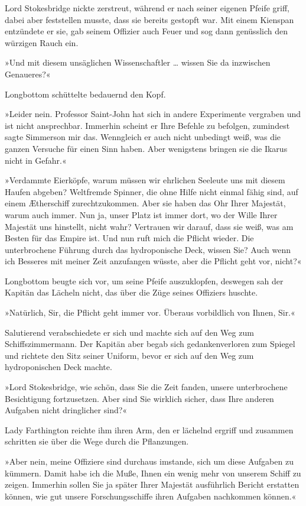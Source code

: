 Lord Stokesbridge nickte zerstreut, während er nach seiner eigenen
Pfeife griff, dabei aber feststellen musste, dass sie bereits
gestopft war. Mit einem Kienspan entzündete er sie, gab seinem
Offizier auch Feuer und sog dann genüsslich den würzigen Rauch
ein.

»Und mit diesem unsäglichen Wissenschaftler \ldots{} wissen Sie da
inzwischen Genaueres?«

Longbottom schüttelte bedauernd den Kopf.

»Leider nein. Professor Saint-John hat sich in andere Experimente
vergraben und ist nicht ansprechbar. Immerhin scheint er Ihre
Befehle zu befolgen, zumindest sagte Simmerson mir das. Wenngleich
er auch nicht unbedingt weiß, was die ganzen Versuche für einen
Sinn haben. Aber wenigstens bringen sie die Ikarus nicht in
Gefahr.«

»Verdammte Eierköpfe, warum müssen wir ehrlichen Seeleute uns mit
diesem Haufen abgeben? Weltfremde Spinner, die ohne Hilfe nicht
einmal fähig sind, auf einem Ætherschiff zurechtzukommen. Aber sie
haben das Ohr Ihrer Majestät, warum auch immer. Nun ja, unser Platz
ist immer dort, wo der Wille Ihrer Majestät uns hinstellt, nicht
wahr? Vertrauen wir darauf, dass sie weiß, was am Besten für das
Empire ist. Und nun ruft mich die Pflicht wieder. Die unterbrochene
Führung durch das hydroponische Deck, wissen Sie? Auch wenn ich
Besseres mit meiner Zeit anzufangen wüsste, aber die Pflicht geht
vor, nicht?«

Longbottom beugte sich vor, um seine Pfeife auszuklopfen, deswegen
sah der Kapitän das Lächeln nicht, das über die Züge seines
Offiziers huschte.

»Natürlich, Sir, die Pflicht geht immer vor. Überaus vorbildlich
von Ihnen, Sir.«

Salutierend verabschiedete er sich und machte sich auf den Weg zum
Schiffszimmermann. Der Kapitän aber begab sich gedankenverloren zum
Spiegel und richtete den Sitz seiner Uniform, bevor er sich auf den
Weg zum hydroponischen Deck machte.

\bigpar

»Lord Stokesbridge, wie schön, dass Sie die Zeit fanden, unsere
unterbrochene Besichtigung fortzusetzen. Aber sind Sie wirklich
sicher, dass Ihre anderen Aufgaben nicht dringlicher sind?«

Lady Farthington reichte ihm ihren Arm, den er lächelnd ergriff und
zusammen schritten sie über die Wege durch die Pflanzungen.

»Aber nein, meine Offiziere sind durchaus imstande, sich um diese
Aufgaben zu kümmern. Damit habe ich die Muße, Ihnen ein wenig mehr
von unserem Schiff zu zeigen. Immerhin sollen Sie ja später Ihrer
Majestät ausführlich Bericht erstatten können, wie gut unsere
Forschungsschiffe ihren Aufgaben nachkommen können.«

